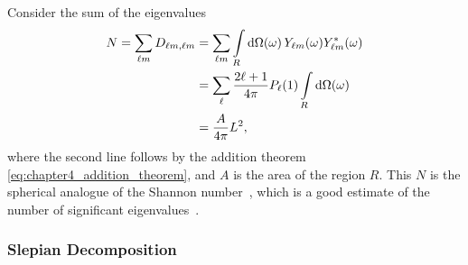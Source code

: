 Consider the sum of the eigenvalues
%
\begin{align}\label{eq:chapter4_shannon}
	N
	= \displaystyle\sum\limits_{\ell m} D_{\ell m,\ell m}
	 & = \displaystyle\sum\limits_{\ell m} \displaystyle\int\limits_{R} \dd{\Omega(\omega)} {Y}_{\ell m}(\omega) {Y}_{\ell m}^{\ast}(\omega) \nonumber \\
	 & = \sum\limits_{\ell} \frac{2\ell+1}{4\pi} P_{\ell}(1) \displaystyle\int\limits_{R} \dd{\Omega(\omega)} \nonumber                        \\
	 & = \frac{A}{4\pi} L^{2},
\end{align}
%
where the second line follows by the addition theorem \cref{eq:chapter4_addition_theorem}, and \(A\) is the area of the region \(R\).
This \(N\) is the spherical analogue of the Shannon number~\cite{Simons2006}, which is a good estimate of the number of significant eigenvalues~\cite{Percival1993}.

\subsubsection{Slepian Decomposition}

